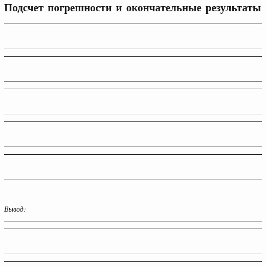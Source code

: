     \pagebreak
    
    \subsection{Подсчет погрешности и окончательные результаты}
    \center
    \rule{.95\textwidth}{.5pt} \\ \rule{.95\textwidth}{.5pt}
    \rule{.95\textwidth}{.5pt} \\ \rule{.95\textwidth}{.5pt}
    \rule{.95\textwidth}{.5pt} \\ \rule{.95\textwidth}{.5pt}
    \rule{.95\textwidth}{.5pt} \\ \rule{.95\textwidth}{.5pt}
    \rule{.95\textwidth}{.5pt} \\ \rule{.95\textwidth}{.5pt} \\
    \vspace*{2em}
    
    \emph{Вывод:} \rule{.885\textwidth}{.5pt}
    \rule{.95\textwidth}{.5pt} \\ \rule{.95\textwidth}{.5pt}
    \rule{.95\textwidth}{.5pt}

